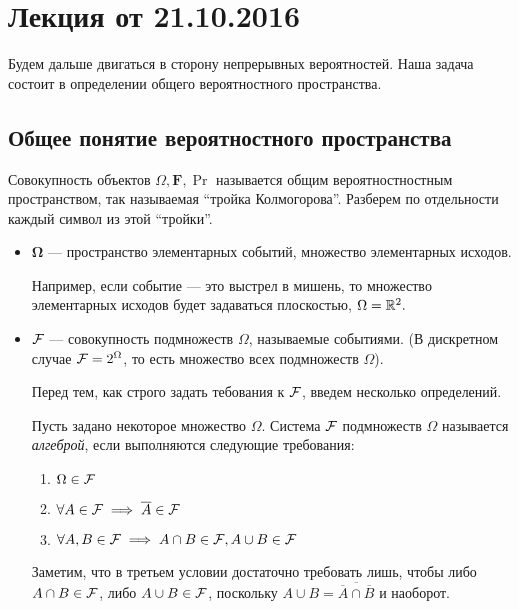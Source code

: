 \section{Лекция от 21.10.2016}

Будем дальше двигаться в сторону непрерывных вероятностей. Наша задача состоит в определении общего вероятностного пространства.

\subsection{Общее понятие вероятностного пространства}
Совокупность объектов \(\Omega, \mathbf{F}, \Pr \) называется общим вероятностностным пространством, так называемая ``тройка Колмогорова''.
Разберем по отдельности каждый символ из этой ``тройки''.
\begin{itemize}
	\item $\mathbf{\Omega}$ --- пространство элементарных событий, множество элементарных исходов.
    
	Например, если событие --- это выстрел в мишень, то множество элементарных исходов будет задаваться плоскостью, \(\Omega = \mathbb{R}^2. \)
	
	\item $\mathcal{F}$ --- совокупность подмножеств $\Omega$, называемые событиями. (В дискретном случае $\mathcal{F} = 2^{\Omega}$, то есть множество всех подмножеств $ \Omega $).
    
    Перед тем, как строго задать тебования к $ \mathcal{F} $, введем несколько определений.
    
        \begin{definition} 
            Пусть задано некоторое множество $ \Omega $. Система $ \mathcal{F} $ подмножеств $ \Omega $ называется \emph{алгеброй}, если выполняются следующие требования:
            
            
            \begin{enumerate}
                \item \( \Omega \in \mathcal{F} \)
                
                \item \( \forall A \in \mathcal{F} \implies \overline{A} \in \mathcal{F} \)
                
                \item \( \forall A, B \in \mathcal{F} \implies A \cap B \in \mathcal{F}, A \cup B \in \mathcal{F} \)
            \end{enumerate}
            Заметим, что в третьем условии достаточно требовать лишь, чтобы либо \(A \cap B \in \mathcal{F}\), либо \(A \cup B \in \mathcal{F}\), поскольку \(A \cup B = \overline {\overline{A} \cap \overline{B}}\) и наоборот. 
            

\end{definition}
\end{itemize}
